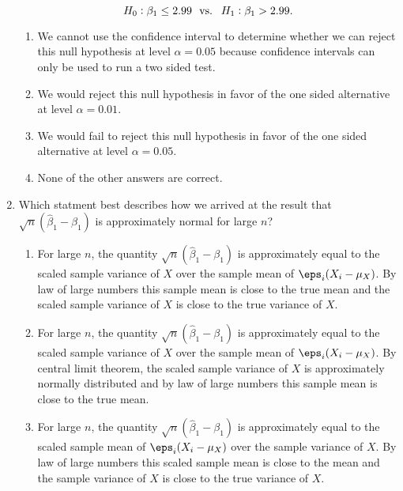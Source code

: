 \documentclass[10pt]{article}
\begin{document}
\begin{enumerate}
	\[H_0: \beta_1 \leq 2.99\hbox{ }\text{ vs. }\hbox{ }H_1: \beta_1 > 2.99.\] 
	\begin{enumerate}
		\item We cannot use the confidence interval to determine whether we can reject this null hypothesis at level \(\alpha = 0.05\) because confidence intervals can only be used to run a two sided test.
		\item We would reject this null hypothesis in favor of the one sided alternative at level \(\alpha = 0.01\).
		\item We would fail to reject this null hypothesis in favor of the one sided alternative at level \(\alpha = 0.05\).
		\item None of the other answers are correct.
	\end{enumerate}
	 
	\item Which statment best describes how we arrived at the result that \(\sqrt{n}(\hat\beta_1 - \beta_1)\) is approximately normal for large \(n\)?
	 \begin{enumerate}
		\item For large \(n\), the quantity \(\sqrt{n}(\hat\beta_1-\beta_1)\) is approximately equal to the scaled sample variance of  \(X\) over the sample mean of  \(\eps_i(X_i -\mu_X)\). By law of large numbers this sample mean is close to the true mean and the scaled sample variance of  \(X\) is close to the true variance of  \(X\). 
		\item For large \(n\), the quantity \(\sqrt{n}(\hat\beta_1-\beta_1)\) is approximately equal to the scaled sample variance of  \(X\) over the sample mean of  \(\eps_i(X_i -\mu_X)\).  By central limit theorem, the scaled sample variance of \(X\) is approximately normally distributed and by law of large numbers this sample mean is close to the true mean.  
		\item For large \(n\), the quantity \(\sqrt{n}(\hat\beta_1-\beta_1)\) is approximately equal to the scaled sample mean of  \(\eps_i(X_i -\mu_X)\) over the sample variance of  \(X\). By law of large numbers this scaled sample mean is close to the mean and the sample variance of  \(X\) is close to the true variance of  \(X\).

\end{enumerate}
\end{enumerate}
\end{document}
